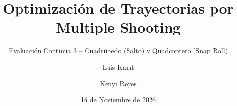 
\usepackage{amsmath,amssymb,amsfonts,bm}
\usepackage{booktabs}
\usepackage{graphicx}
\usepackage{appendixnumberbeamer}
\usepackage{pgfplots}
\pgfplotsset{compat=1.18}
\usetikzlibrary{arrows.meta,positioning}

\graphicspath{{figures/}{../report/figures/}}

\newcommand{\bp}{\bm{p}}
\newcommand{\bv}{\bm{v}}
\newcommand{\bx}{\bm{x}}
\newcommand{\bu}{\bm{u}}
\newcommand{\bz}{\bm{z}}
\newcommand{\bef}{\bm{f}}
\newcommand{\bd}{\bm{d}}
\newcommand{\bomega}{\bm{\omega}}
\newcommand{\btau}{\bm{\tau}}
\newcommand{\bR}{\mathbf{R}}
\newcommand{\RR}{\mathbb{R}}
\newcommand{\tr}{^{\top}}


\title[Optimización de Trayectorias]{Optimización de Trayectorias por Multiple Shooting}
\subtitle{Evaluación Continua 3 -- Cuadrúpedo (Salto) y Quadcoptero (Snap Roll)}
\author{Luis Kamt \and Kenyi Reyes}
\date{16 de Noviembre de 2026}